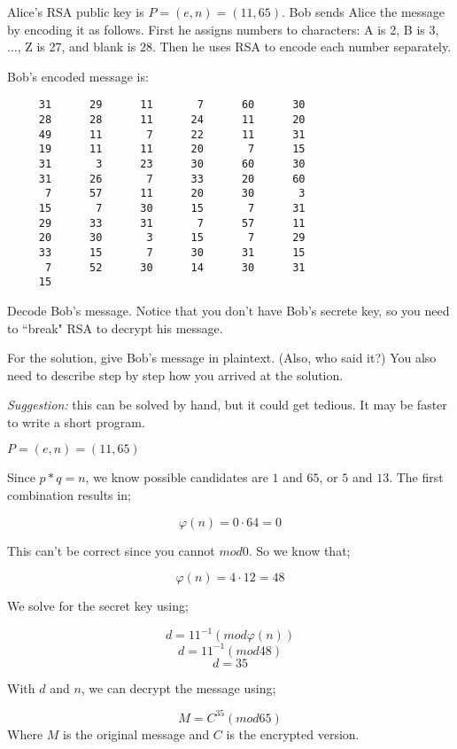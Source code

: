 
\begin{problem}
Alice's RSA public key is $P = (e,n) = (11,65)$.
Bob sends Alice the message by encoding it as follows.
First he assigns numbers to characters:
A is 2, B is 3, ..., Z is 27, and blank is 28. Then he
uses RSA to encode each number separately. 

Bob's encoded message is:

\begin{verbatim}
     31      29      11       7      60      30
     28      28      11      24      11      20
     49      11       7      22      11      31
     19      11      11      20       7      15
     31       3      23      30      60      30
     31      26       7      33      20      60
      7      57      11      20      30       3
     15       7      30      15       7      31
     29      33      31       7      57      11
     20      30       3      15       7      29
     33      15       7      30      31      15
      7      52      30      14      30      31
     15
\end{verbatim}

Decode Bob's message.
Notice that you don't have Bob's secrete key, so you
need to ``break" RSA to decrypt his message.

For the solution, give Bob's message in plaintext. (Also, who said it?)
You also need to describe step by step how you arrived at the solution. 

\emph{Suggestion:} this can be solved by hand, but it could get tedious. It may
be faster to write a short program.
\end{problem}

\begin{solution}

$P = (e,n) = (11,65)$

Since $p * q = n$, we know possible candidates are $1$ and $65$, or $5$ and $13$.
The first combination results in; 

\[ \varphi(n) = 0 \cdot 64 = 0 \]

This can't be correct since you cannot $mod 0$. So we know that;

\[ \varphi(n) = 4 \cdot 12 = 48 \]

We solve for the secret key using;

\[ d = 11^{-1}(mod \varphi(n)) \]
\[ d = 11^{-1}(mod 48) \]
\[ d = 35 \]

With $d$ and $n$, we can decrypt the message using;

\[ M = C^{35}(mod 65) \]
Where $M$ is the original message and $C$ is the encrypted version.
\end{solution}
